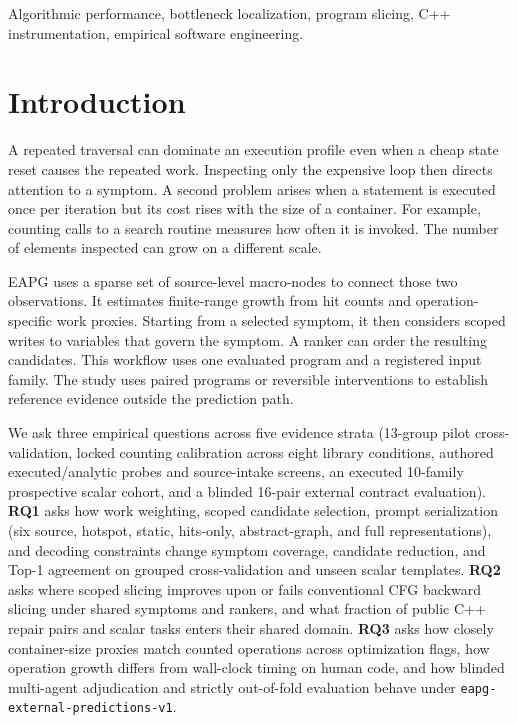 \documentclass[10pt,journal]{IEEEtran}
\begin{document}
\begin{IEEEkeywords}
Algorithmic performance, bottleneck localization, program slicing, C++ instrumentation, empirical software engineering.
\end{IEEEkeywords}

\section{Introduction}

A repeated traversal can dominate an execution profile even when a cheap state reset causes the repeated work. Inspecting only the expensive loop then directs attention to a symptom. A second problem arises when a statement is executed once per iteration but its cost rises with the size of a container. For example, counting calls to a search routine measures how often it is invoked. The number of elements inspected can grow on a different scale.

EAPG uses a sparse set of source-level macro-nodes to connect those two observations. It estimates finite-range growth from hit counts and operation-specific work proxies. Starting from a selected symptom, it then considers scoped writes to variables that govern the symptom. A ranker can order the resulting candidates. This workflow uses one evaluated program and a registered input family. The study uses paired programs or reversible interventions to establish reference evidence outside the prediction path.

We ask three empirical questions across five evidence strata (13-group pilot cross-validation, locked counting calibration across eight library conditions, authored executed/analytic probes and source-intake screens, an executed 10-family prospective scalar cohort, and a blinded 16-pair external contract evaluation). \textbf{RQ1} asks how work weighting, scoped candidate selection, prompt serialization (six source, hotspot, static, hits-only, abstract-graph, and full representations), and decoding constraints change symptom coverage, candidate reduction, and Top-1 agreement on grouped cross-validation and unseen scalar templates. \textbf{RQ2} asks where scoped slicing improves upon or fails conventional CFG backward slicing under shared symptoms and rankers, and what fraction of public C++ repair pairs and scalar tasks enters their shared domain. \textbf{RQ3} asks how closely container-size proxies match counted operations across optimization flags, how operation growth differs from wall-clock timing on human code, and how blinded multi-agent adjudication and strictly out-of-fold evaluation behave under \texttt{eapg-external-predictions-v1}.
\end{document}
